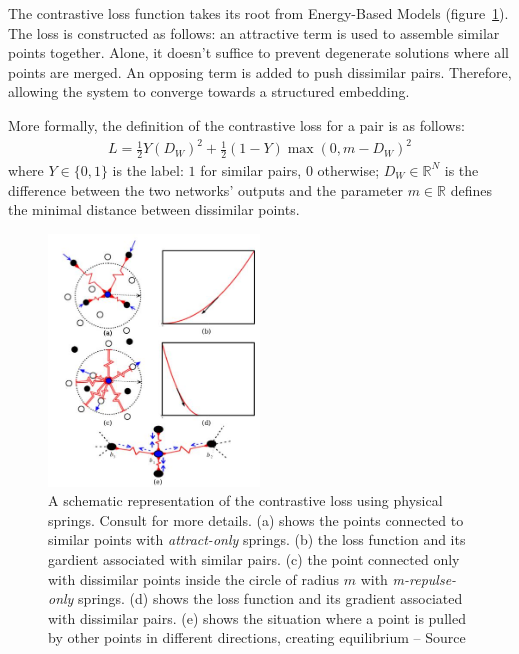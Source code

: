 \documentclass[a4paper,12pt]{report}
\newcommand{\R}{\mathbb{R}}
\begin{document}
The contrastive loss function takes its root from Energy-Based Models (figure~\ref{fig:contrastive_spring}).
The loss is constructed as follows: an attractive term is used to assemble similar points together.
Alone, it doesn't suffice to prevent degenerate solutions where all points are merged.
An opposing term is added to push dissimilar pairs.
Therefore, allowing the system to converge towards a structured embedding.

More formally, the definition of the contrastive loss for a pair is as follows:
\begin{eqnarray}
    L = \frac{1}{2} Y (D_W)^2 + \frac{1}{2} (1-Y) \max(0, m - D_W)^2
\end{eqnarray}
where $Y \in \{0,1\}$ is the label: $1$ for similar pairs, $0$ otherwise; $D_W \in \R^N$ is the difference between the two networks' outputs and the parameter $m \in \R$ defines the minimal distance between dissimilar points.

\begin{figure}[t]
    \begin{center}
        \includegraphics[width=0.5\textwidth]{thesis_figures/contrastive_spring.jpg}
    \end{center}
    \caption{A schematic representation of the contrastive loss using physical springs. Consult \cite{hadsell2006dimensionality} for more details. (a) shows the points connected to similar points with {\em attract-only} springs. (b) the loss function and its gardient associated with similar pairs. (c) the point connected only with dissimilar points inside the circle of radius $m$ with {\em m-repulse-only} springs. (d) shows the loss function and its gradient associated with dissimilar pairs. (e) shows the situation where a point is pulled by other points in different directions, creating equilibrium -- Source \cite{hadsell2006dimensionality}}
    \label{fig:contrastive_spring}
\end{figure}
\end{document}
